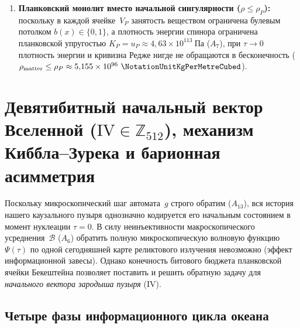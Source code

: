 \begin{theorem}[Мост времени $t_{\mathrm{SI}}(\tau) = \tau\,\htick$ и отсутствие сингулярности]
\begin{enumerate}[leftmargin=*]
\[  \]
  так что для любой календарной даты с интервалом $\Delta t_{\mathrm{UTC}}$ секунд от опорной эпохи текущий такт Вселенной равен $N(\text{дата}) = N_{\mathrm{today}}^{\mathrm{alg}} + \Delta t_{\mathrm{UTC}}\,\mathcal{N}_{\mathrm{sec}}(3)$.
\item \textbf{Планковский монолит вместо начальной сингулярности ($\rho \le \rho_P$):}
  поскольку в каждой ячейке~$V_P$ занятость веществом ограничена булевым потолком $b(x) \in \{0,1\}$, а плотность энергии спинора ограничена планковской упругостью $K_P = u_P \approx 4{,}63\times 10^{113}\ \mathrm{Па}$ ($A_7$), при $\tau \to 0$ плотность энергии и кривизна Редже нигде не обращаются в бесконечность ($\rho_{\mathrm{matter}} \le \rho_P \approx 5{,}155\times 10^{96}\ \NotationUnitKgPerMetreCubed$).
\end{enumerate}
\end{theorem}

\chapter{Девятибитный начальный вектор Вселенной (\texorpdfstring{$\mathrm{IV}\in\mathbb{Z}_{512}$}{IV in Z512}), механизм Киббла--Зурека и барионная асимметрия}
\label{ch:cosmo-9bit-iv}

Поскольку микроскопический шаг автомата~$g$ строго обратим ($A_{13}$), вся история нашего каузального пузыря однозначно кодируется его начальным состоянием в момент нуклеации $\tau = 0$.
В силу неинъективности макроскопического усреднения~$\mathcal{B}$ ($A_6$) обратить полную микроскопическую волновую функцию $\Psi(\tau)$ по одной сегодняшней карте реликтового излучения невозможно (эффект информационной завесы).
Однако конечность битового бюджета планковской ячейки Бекештейна позволяет поставить и решить обратную задачу для \emph{начального вектора зародыша пузыря} ($\mathrm{IV}$).

\section{Четыре фазы информационного цикла океана}
\label{sec:cosmo-four-phases}

